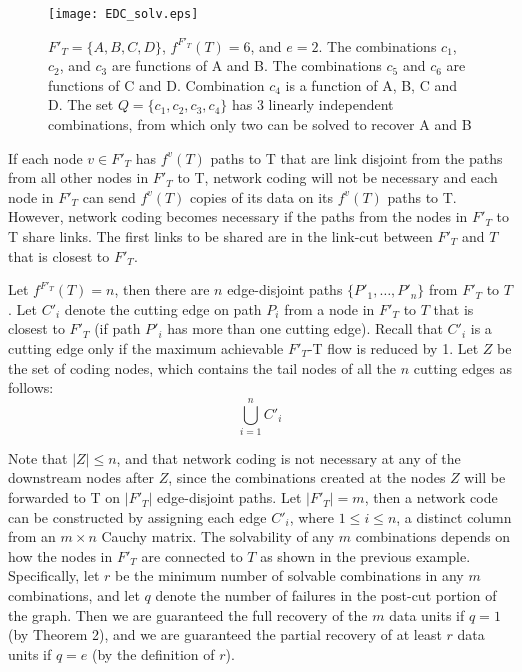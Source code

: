 \documentclass[conference]{IEEEtran}
\begin{document}
\begin{figure}[tbh]
\centering
\texttt{[image: EDC\_solv.eps]}
\caption{$F'_T = \{A,B,C,D\}$, $f^{F'_T}(T) = 6$, and $e = 2$. The combinations $c_1$, $c_2$, and $c_3$ are functions of A and B. The combinations $c_5$ and $c_6$ are functions of C and D. Combination $c_4$ is a function of A, B, C and D. The set $Q = \{c_1,c_2,c_3,c_4\}$ has 3 linearly independent combinations, from which only two can be solved to recover A and B}
\label{Fig:EDC_solv}
\end{figure}




If each node $v \in F'_T$ has $f^v(T)$ paths to T that are link disjoint from the paths from all other nodes in $F'_T$ to T, network coding will not be necessary and each node in $F'_T$ can send $f^v(T)$ copies of its data on its $f^v(T)$ paths to T. However, network coding becomes necessary if the paths from the nodes in $F'_T$ to T share links. The first links to be shared are in the link-cut between $F'_T$ and $T$ that is closest to $F'_T$. 


Let $f^{F'_T}(T) = n$, then there are $n$ edge-disjoint paths $\{P'_1, \dots, P'_n\}$ from $F'_T$ to $T$. Let $C'_i$ denote the cutting edge on path $P_i$ from a node in $F'_T$ to $T$ that is closest to $F'_T$ (if path $P'_i$ has more than one cutting edge). Recall that $C'_i$ is a cutting edge only if the maximum achievable $F'_T$-T flow is reduced by 1. Let $Z$ be the set of coding nodes, which contains the tail nodes of all the $n$ cutting edges as follows:\[\bigcup_{i=1}^nC'_i\]



Note that $|Z| \leq n$, and that network coding is not necessary at any of the downstream nodes after $Z$, since the combinations created at the nodes $Z$ will be forwarded to T on $|F'_T|$ edge-disjoint paths. Let $|F'_T| = m$, then a network code can be constructed by assigning each edge $C'_i$, where $1 \leq i \leq n$, a distinct column from an  $m \times n$ Cauchy matrix. The solvability of any $m$ combinations depends on how the nodes in $F'_T$ are connected to $T$ as shown in the previous example. Specifically, let $r$ be the minimum number of solvable combinations in any $m$ combinations, and let $q$ denote the number of failures in the post-cut portion of the graph. Then we are guaranteed the full recovery of the $m$ data units if $q=1$ (by Theorem 2), and we are guaranteed the partial recovery of at least $r$ data units if $q = e$ (by the definition of $r$).
\end{document}
